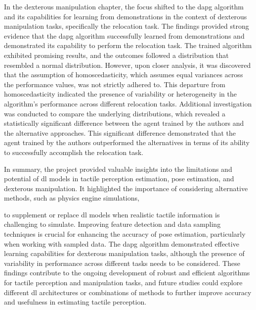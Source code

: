 In the dexterous manipulation chapter, the focus shifted to the \gls{dapg} algorithm and its capabilities for learning from demonstrations in the context of dexterous manipulation tasks, specifically the relocation task. The findings provided strong evidence that the \gls{dapg} algorithm successfully learned from demonstrations and demonstrated its capability to perform the relocation task. The trained algorithm exhibited promising results, and the outcomes followed a distribution that resembled a normal distribution. However, upon closer analysis, it was discovered that the assumption of homoscedasticity, which assumes equal variances across the performance values, was not strictly adhered to. This departure from homoscedasticity indicated the presence of variability or heterogeneity in the algorithm's performance across different relocation tasks. Additional investigation was conducted to compare the underlying distributions, which revealed a statistically significant difference between the agent trained by the authors and the alternative approaches. This significant difference demonstrated that the agent trained by the authors outperformed the alternatives in terms of its ability to successfully accomplish the relocation task.

In summary, the project provided valuable insights into the limitations and potential of \gls{dl} models in tactile perception estimation, pose estimation, and dexterous manipulation. It highlighted the importance of considering alternative methods, such as physics engine simulations,

 to supplement or replace \gls{dl} models when realistic tactile information is challenging to simulate. Improving feature detection and data sampling techniques is crucial for enhancing the accuracy of pose estimation, particularly when working with sampled data. The \gls{dapg} algorithm demonstrated effective learning capabilities for dexterous manipulation tasks, although the presence of variability in performance across different tasks needs to be considered. These findings contribute to the ongoing development of robust and efficient algorithms for tactile perception and manipulation tasks, and future studies could explore different \gls{dl} architectures or combinations of methods to further improve accuracy and usefulness in estimating tactile perception.